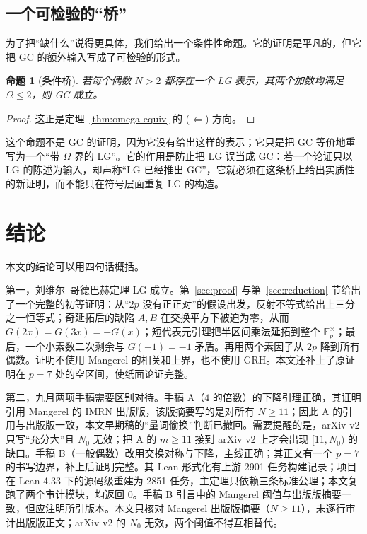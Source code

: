 \documentclass[11pt,a4paper]{ctexart}
\theoremstyle{plain}
\newtheorem{proposition}[theorem]{命题}
\theoremstyle{definition}
\newcommand{\Fpx}{\mathbb{F}_p^{\times}}
\newcommand{\Om}{\Omega}
\begin{document}
\subsection{一个可检验的“桥”}
\label{sec:bridge}

为了把“缺什么”说得更具体，我们给出一个条件性命题。它的证明是平凡的，但它把 GC 的额外输入写成了可检验的形式。

\begin{proposition}[条件桥]
\label{prop:bridge}
若每个偶数 $N>2$ 都存在一个 LG 表示，其两个加数均满足 $\Om\le2$，则 GC 成立。
\end{proposition}

\begin{proof}
这正是定理~\ref{thm:omega-equiv} 的 ($\Leftarrow$) 方向。
\end{proof}

这个命题不是 GC 的证明，因为它没有给出这样的表示；它只是把 GC 等价地重写为一个“带 $\Om$ 界的 LG”。它的作用是防止把 LG 误当成 GC：若一个论证只以 LG 的陈述为输入，却声称“LG 已经推出 GC”，它就必须在这条桥上给出实质性的新证明，而不能只在符号层面重复 LG 的构造。

\section{结论}
\label{sec:conclusion}

本文的结论可以用四句话概括。

第一，刘维尔--哥德巴赫定理 LG 成立。第~\ref{sec:proof} 与第~\ref{sec:reduction} 节给出了一个完整的初等证明：从“$2p$ 没有正正对”的假设出发，反射不等式给出上三分之一恒等式；奇延拓后的缺陷 $A,B$ 在交换平方下被迫为零，从而 $G(2x)=G(3x)=-G(x)$；短代表元引理把半区间乘法延拓到整个 $\Fpx$；最后，一个小素数二次剩余与 $G(-1)=-1$ 矛盾。再用两个素因子从 $2p$ 降到所有偶数。证明不使用 Mangerel 的相关和上界，也不使用 GRH。本文还补上了原证明在 $p=7$ 处的空区间，使纸面论证完整。

第二，九月两项手稿需要区别对待。手稿 A（$4$ 的倍数）的下降引理正确，其证明引用 Mangerel 的 IMRN 出版版，该版摘要写的是对所有 $N\ge11$；因此 A 的引用与出版版一致，本文早期稿的“量词偷换”判断已撤回。需要提醒的是，arXiv v2 只写“充分大”且 $N_0$ 无效；把 A 的 $m\ge11$ 接到 arXiv v2 上才会出现 $[11,N_0)$ 的缺口。手稿 B（一般偶数）改用交换对称与下降，主线正确；其正文有一个 $p=7$ 的书写边界，补上后证明完整。其 Lean 形式化有上游 2901 任务构建记录；项目在 Lean 4.33 下的源码级重建为 2851 任务，主定理只依赖三条标准公理；本文复跑了两个审计模块，均返回 0。手稿 B 引言中的 Mangerel 阈值与出版版摘要一致，但应注明所引版本。本文只核对 Mangerel 出版版摘要（$N\ge11$），未逐行审计出版版正文；arXiv v2 的 $N_0$ 无效，两个阈值不得互相替代。
\end{document}
